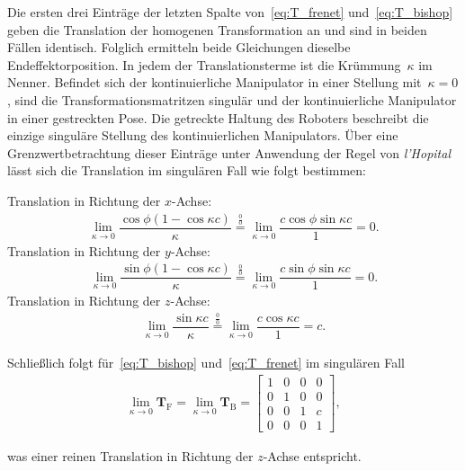 Die ersten drei Einträge der letzten Spalte von~\eqref{eq:T_frenet} und~\eqref{eq:T_bishop} geben die  Translation der homogenen Transformation an und sind in beiden Fällen identisch. Folglich ermitteln beide Gleichungen dieselbe Endeffektorposition.
In jedem der Translationsterme ist die Krümmung~$\kappa$ im Nenner. Befindet sich der kontinuierliche Manipulator in einer Stellung mit~$\kappa=0$, sind die Transformationsmatritzen singulär und der kontinuierliche Manipulator in einer gestreckten Pose. Die getreckte Haltung des Roboters beschreibt die einzige singuläre Stellung des kontinuierlichen Manipulators. Über eine Grenzwertbetrachtung dieser Einträge unter Anwendung der Regel von \textit{l'Hopital} lässt sich die Translation im singulären Fall wie folgt bestimmen:

\vspace{0.1cm}
Translation in Richtung der \mbox{$x$-Achse}:
\begin{align*}
\lim\limits_{\kappa \to 0} \dfrac{\cos\phi (1-\cos\kappa c)}{\kappa} \stackrel{\frac{0}{0}}{=} 
\lim\limits_{\kappa \to 0} \dfrac{c\cos\phi \sin\kappa c}{1} = 0.
\end{align*}
Translation in Richtung der \mbox{$y$-Achse}:
\begin{align*}
\lim\limits_{\kappa \to 0} \dfrac{\sin\phi (1-\cos\kappa c)}{\kappa} \stackrel{\frac{0}{0}}{=}
\lim\limits_{\kappa \to 0} \dfrac{c\sin\phi \sin\kappa c}{1} = 0.
\end{align*}
Translation in Richtung der \mbox{$z$-Achse}:
\begin{align*}
\lim\limits_{\kappa \to 0} \dfrac{\sin\kappa c}{\kappa} \stackrel{\frac{0}{0}}{=}
\lim\limits_{\kappa \to 0} \dfrac{c \cos\kappa c }{1} = c.
\end{align*}

Schließlich folgt für~\eqref{eq:T_bishop} und~\eqref{eq:T_frenet} im singulären Fall
\begin{align*}
\lim\limits_{\kappa \to 0} \bm{T}_\mathrm{F} = \lim\limits_{\kappa \to 0} \bm{T}_\mathrm{B} = 
\begin{bmatrix}
1 & 0 & 0 & 0 \\
0 & 1 & 0 & 0 \\
0 & 0 & 1 & c \\
0 & 0 & 0 & 1
\end{bmatrix},
\end{align*}

was einer reinen Translation in Richtung der $z$-Achse entspricht. \newline


